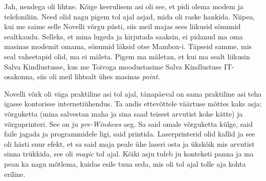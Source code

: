 
Jah, nendega oli lihtne. Kõige keerulisem asi oli see, et pidi olema modem ja 
telefoniliin. Need olid nagu pigem tol ajal asjad, mida oli raske hankida. 
Niipea, kui me saime selle Novelli võrgu püsti, siis meil majas sees liikusid 
sõnumid sealtkaudu. Selleks, et mina lugeda ja kirjutada saaksin, ei pidanud ma 
oma masinas modemit omama, sõnumid läksid otse Mambox-i. Täpseid samme, mis 
seal vaheetapid olid, ma ei mäleta. Pigem ma mäletan, et kui ma sealt liikusin 
Salva Kindlustusse, kus me Toivoga moodustasime Salva Kindlustuse IT-osakonna, 
siis oli meil lihtsalt ühes masinas \emph{point}. 


Novelli võrk oli väga praktiline asi tol ajal, tänapäeval on sama praktiline 
asi teha igasse kontorisse internetiühendus. Ta andis ettevõttele väärtuse 
mõttes kaks asja: võrguketta (mina salvestan maha ja sina saad teisest 
arvutist kohe kätte) ja võrguprinteri. See on ju \emph{pre-Windows} aeg. Sa 
said omale võrguketta külge, said faile jagada ja  programmidele ligi, 
said printida. Laserprinterid olid kallid ja see oli hästi suur efekt, et sa 
said maja peale ühe laseri osta ja ükskõik mis arvutist sinna trükkida, see oli 
\emph{magic} tol ajal. Kõiki asju tuleb ju konteksti panna ja ma pean ka nagu 
mõtlema, kuidas esile tuua seda, mis oli tol ajal tolle aja kohta eriline. 


